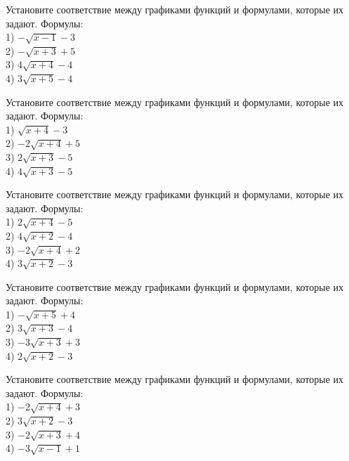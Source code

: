 \documentclass[4apaper]{article}
\begin{document}
\begin{taskBN}{21}
Установите соответствие между графиками функций и формулами, которые их задают. Формулы: \\1) $-\sqrt{x-1}-3$\\2) $-\sqrt{x+3}+5$\\3) $4\sqrt{x+4}-4$\\4) $3\sqrt{x+5}-4$
\end{taskBN}

\begin{taskBN}{22}
Установите соответствие между графиками функций и формулами, которые их задают. Формулы: \\1) $\sqrt{x+4}-3$\\2) $-2\sqrt{x+4}+5$\\3) $2\sqrt{x+3}-5$\\4) $4\sqrt{x+3}-5$
\end{taskBN}

\begin{taskBN}{23}
Установите соответствие между графиками функций и формулами, которые их задают. Формулы: \\1) $2\sqrt{x+4}-5$\\2) $4\sqrt{x+2}-4$\\3) $-2\sqrt{x+4}+2$\\4) $3\sqrt{x+2}-3$
\end{taskBN}

\begin{taskBN}{24}
Установите соответствие между графиками функций и формулами, которые их задают. Формулы: \\1) $-\sqrt{x+5}+4$\\2) $3\sqrt{x+3}-4$\\3) $-3\sqrt{x+3}+3$\\4) $2\sqrt{x+2}-3$
\end{taskBN}

\begin{taskBN}{25}
Установите соответствие между графиками функций и формулами, которые их задают. Формулы: \\1) $-2\sqrt{x+4}+3$\\2) $3\sqrt{x+2}-3$\\3) $-2\sqrt{x+3}+4$\\4) $-3\sqrt{x-1}+1$
\end{taskBN}
\end{document}

